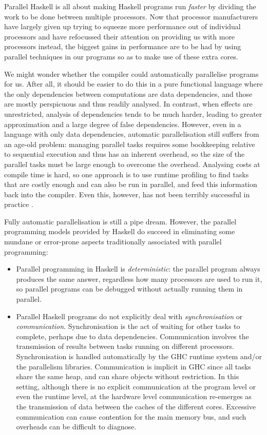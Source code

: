 
Parallel Haskell is all about making Haskell programs run
\emph{faster} by dividing the work to be done between multiple
processors.  Now that processor manufacturers have largely given up
trying to squeeze more performance out of individual processors and
have refocussed their attention on providing us with more processors
instead, the biggest gains in performance are to be had by using
parallel techniques in our programs so as to make use of these extra
cores.

We might wonder whether the compiler could automatically parallelise
programs for us.  After all, it should be easier to do this in a pure
functional language where the only dependencies between computations
are data dependencies, and those are mostly perspicuous and thus
readily analysed.  In contrast, when effects are unrestricted,
analysis of dependencies tends to be much harder, leading to greater
approximation and a large degree of false dependencies.  However, even
in a language with only data dependencies, automatic parallelisation
still suffers from an age-old problem: managing parallel tasks requires
some bookkeeping relative to sequential execution and thus has an
inherent overhead, so the size of the parallel tasks must be large
enough to overcome the overhead.  Analysing costs at compile time is
hard, so one approach is to use runtime profiling to find tasks that
are costly enough and can also be run in parallel, and feed this
information back into the compiler.  Even this, however, has not been
terribly successful in practice \cite{fdip}.

Fully automatic parallelisation is still a pipe dream.  However, the
parallel programming models provided by Haskell do succeed in
eliminating some mundane or error-prone aspects traditionally
associated with parallel programming:

\begin{itemize}
\item Parallel programming in Haskell is \emph{deterministic}: the
  parallel program always produces the same answer, regardless how
  many processors are used to run it, so parallel programs can be
  debugged without actually running them in parallel.

\item Parallel Haskell programs do not explicitly deal with
  \emph{synchronisation} or \emph{communication}.  Synchronisation is
  the act of waiting for other tasks to complete, perhaps due to data
  dependencies.  Communication involves the transmission of results
  between tasks running on different processors.  Synchronisation is
  handled automatically by the GHC runtime system and/or the
  parallelism libraries.  Communication is implicit in GHC since all
  tasks share the same heap, and can share objects without
  restriction.  In this setting, although there is no explicit
  communication at the program level or even the runtime level, at the
  hardware level communication re-emerges as the transmission of data
  between the caches of the different cores.  Excessive communication
  can cause contention for the main memory bus, and such overheads can
  be difficult to diagnose.
\end{itemize}

